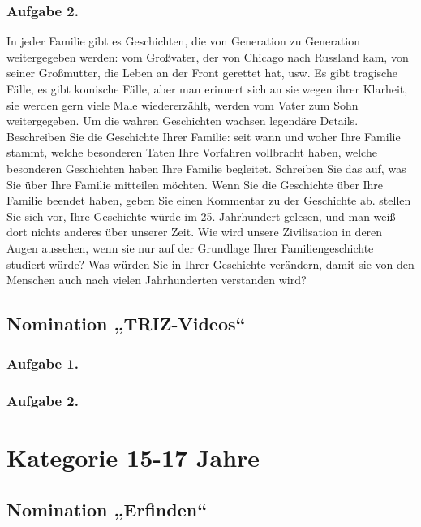 \documentclass[11pt,a4paper]{article}
\begin{document}
\subsubsection*{Aufgabe 2.}
In jeder Familie gibt es Geschichten, die von Generation zu Generation
weitergegeben werden: vom Großvater, der von Chicago nach Russland kam, von
seiner Großmutter, die Leben an der Front gerettet hat, usw. Es gibt tragische
Fälle, es gibt komische Fälle, aber man erinnert sich an sie wegen ihrer
Klarheit, sie werden gern viele Male wiedererzählt, werden vom Vater zum Sohn
weitergegeben. Um die wahren Geschichten wachsen legendäre Details.
Beschreiben Sie die Geschichte Ihrer Familie: seit wann und woher Ihre Familie
stammt, welche besonderen Taten Ihre Vorfahren vollbracht haben, welche
besonderen Geschichten haben Ihre Familie begleitet. Schreiben Sie das auf,
was Sie über Ihre Familie mitteilen möchten.  Wenn Sie die Geschichte über
Ihre Familie beendet haben, geben Sie einen Kommentar zu der Geschichte ab.
stellen Sie sich vor, Ihre Geschichte würde im 25. Jahrhundert gelesen, und
man weiß dort nichts anderes über unserer Zeit. Wie wird unsere Zivilisation
in deren Augen aussehen, wenn sie nur auf der Grundlage Ihrer
Familiengeschichte studiert würde? Was würden Sie in Ihrer Geschichte
verändern, damit sie von den Menschen auch nach vielen Jahrhunderten
verstanden wird?

\subsection{Nomination „TRIZ-Videos“}
\subsubsection*{Aufgabe 1.}\VideoOne
\subsubsection*{Aufgabe 2.}\VideoTwo

\GeneralText
\clearpage

\section{Kategorie 15-17 Jahre}

\subsection{Nomination „Erfinden“}

\newcommand{\Aberration}{Es ist bekannt, dass sich das gebrochene Sonnenlicht
  in ein Spektrum zerlegt. Die Astronomen haben sehr darunter gelitten. In den
  Linsen des Teleskops wird auch das Licht von Sonne, Planeten und Sternen
  gebrochen. Und kosmische Objekte sind von bunten Auren umgeben, was daran
  hindert, sie richtig zu beobachten. Dieses Phänomen wird als „chromatische
  Aberration“ bezeichnet. Der große englische Physiker I. Newton hielt es für
  unmöglich, sie loszuwerden.  Schlagen Sie eine Methode zur Herstellung von
  Linsen vor, die keine chromatische Aberration verursachen.}
\end{document}
